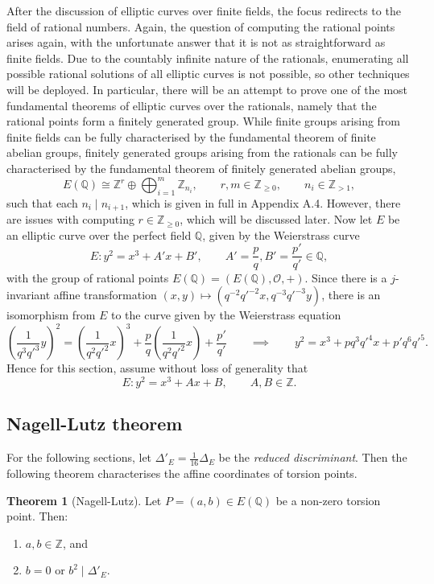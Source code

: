 \documentclass{article}
\newcommand{\Z}{\mathbb{Z}}
\newcommand{\Q}{\mathbb{Q}}
\newcommand{\rb}[1]{\left( #1 \right)}
\theoremstyle{definition}\newtheorem*{definition}{Definition}
\theoremstyle{definition}\newtheorem*{example}{Example}
\theoremstyle{definition}\newtheorem*{remark}{Remark}
\newtheorem{theorem}[proposition]{Theorem}
\begin{document}
After the discussion of elliptic curves over finite fields, the focus redirects to the field of rational numbers. Again, the question of computing the rational points arises again, with the unfortunate answer that it is not as straightforward as finite fields. Due to the countably infinite nature of the rationals, enumerating all possible rational solutions of all elliptic curves is not possible, so other techniques will be deployed. In particular, there will be an attempt to prove one of the most fundamental theorems of elliptic curves over the rationals, namely that the rational points form a finitely generated group. While finite groups arising from finite fields can be fully characterised by the fundamental theorem of finite abelian groups, finitely generated groups arising from the rationals can be fully characterised by the fundamental theorem of finitely generated abelian groups,
$$ E\rb{\Q} \cong \Z^r \oplus \bigoplus_{i = 1}^m \Z_{n_i}, \qquad r, m \in \Z_{\ge 0}, \qquad n_i \in \Z_{> 1}, $$
such that each $ n_i \mid n_{i + 1} $, which is given in full in Appendix A.4. However, there are issues with computing $ r \in \Z_{\ge 0} $, which will be discussed later. Now let $ E $ be an elliptic curve over the perfect field $ \Q $, given by the Weierstrass curve
$$ E : y^2 = x^3 + A'x + B', \qquad A' = \dfrac{p}{q}, B' = \dfrac{p'}{q'} \in \Q, $$
with the group of rational points $ E\rb{\Q} = \rb{E\rb{\Q}, \mathcal{O}, +} $. Since there is a $ j $-invariant affine transformation $ \rb{x, y} \mapsto \rb{q^{-2}q'^{-2}x, q^{-3}q'^{-3}y} $, there is an isomorphism from $ E $ to the curve given by the Weierstrass equation
$$ \rb{\dfrac{1}{q^3q'^3}y}^2 = \rb{\dfrac{1}{q^2q'^2}x}^3 + \dfrac{p}{q}\rb{\dfrac{1}{q^2q'^2}x} + \dfrac{p'}{q'} \qquad \implies \qquad y^2 = x^3 + pq^3q'^4x + p'q^6q'^5. $$
Hence for this section, assume without loss of generality that
$$ E : y^2 = x^3 + Ax + B, \qquad A, B \in \Z. $$

\subsection{Nagell-Lutz theorem}

For the following sections, let $ \Delta'_E = \tfrac{1}{16}\Delta_E $ be the \emph{reduced discriminant}. Then the following theorem characterises the affine coordinates of torsion points.

\begin{theorem}[Nagell-Lutz]
\label{thm:nagelllutz}
Let $ P = \rb{a, b} \in E\rb{\Q} $ be a non-zero torsion point. Then:
\begin{enumerate}
\item $ a, b \in \Z $, and
\item $ b = 0 $ or $ b^2 \mid \Delta'_E $.
\end{enumerate}
\end{theorem}
\end{document}
